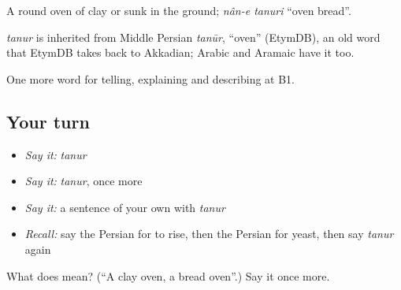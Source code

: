 A round oven of clay or sunk in the ground; \emph{nân-e tanuri} \textquotedblleft{}oven bread\textquotedblright{}.

\begin{cousinweb}
\emph{tanur} is inherited from Middle Persian \emph{tanūr}, \textquotedblleft{}oven\textquotedblright{} (EtymDB), an old word that EtymDB takes back to Akkadian; Arabic and Aramaic have it too.
\end{cousinweb}

\begin{grammarlens}[title={What you've built}]
One more word for telling, explaining and describing at B1.
\end{grammarlens}

\subsection*{Your turn}
\begin{itemize}
\raggedright
  \item \emph{Say it:} \emph{tanur}
  \item \emph{Say it:} \emph{tanur}, once more
  \item \emph{Say it:} a sentence of your own with \emph{tanur}
  \item \emph{Recall:} say the Persian for to rise, then the Persian for yeast, then say \emph{tanur} again
\end{itemize}

\begin{tcolorbox}[breakable,colback=teal!4,colframe=teal!35!black,title={Before you move on}]
What does  mean? (\textquotedblleft{}A clay oven, a bread oven\textquotedblright{}.) Say it once more.
\end{tcolorbox}
